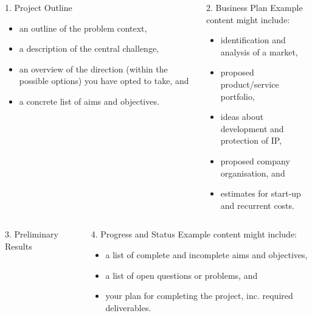 \documentclass[ %
                    author={Daniel Page},
                supervisor={Dr. Ian Holyer},
                     title={Some Structural Guidelines for CS MEng Posters},
                  subtitle={},
                    degree={MEng},
                      year={2012} ]{poster}
\begin{document}
\begin{frame}{}
\begin{columns}[t]
\begin{column}{0.422\linewidth}
\begin{block}{\Large 1. Project Outline}
  \begin{itemize}
  \item an outline of the problem context,
  \item a description of the central challenge, 
  \item an overview of the direction (within the possible options) you 
        have opted to take,
        and
  \item a concrete list of aims and objectives.
  \end{itemize}
  \end{block}
  \end{column}

  \begin{column}{0.422\linewidth}
  \begin{block}{\Large 2. Business Plan}
  Example content might include:

  \begin{itemize}
  \item identification and analysis of a market,
  \item proposed product/service portfolio,
  \item ideas about development and protection of IP,
  \item proposed company organisation,
        and
  \item estimates for start-up and recurrent costs.
  \end{itemize}
  \end{block}
  \end{column}
\end{columns}

\vfill

\begin{columns}[t]
  \begin{column}{0.422\linewidth}
  \begin{block}{\Large 3. Preliminary Results}
  \vspace{10cm}
  \end{block}
  \end{column}
  \begin{column}{0.422\linewidth}
  \begin{block}{\Large 4. Progress and Status}
  Example content might include:

  \begin{itemize}
  \item a list of complete and incomplete aims and objectives,
  \item a list of open questions or problems,
        and
  \item your plan for completing the project, inc. required deliverables.
  \end{itemize}
  \end{block}
  \end{column}
\end{columns}

\vfill

\end{frame}

\end{document}
